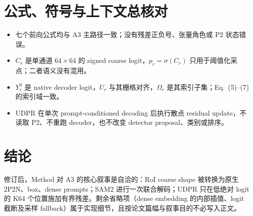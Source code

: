 \documentclass[UTF8,11pt]{ctexart}
\begin{document}
\section*{公式、符号与上下文总核对}
\begin{itemize}
  \item 七个前向公式均与 A3 主路径一致；没有残差正负号、张量角色或 P2 状态错误。
  \item \(C_r\) 是单通道 $64\times64$ 的 signed coarse logit，\(p_r=\sigma(C_r)\) 只用于阈值化采点；二者语义没有混用。
  \item \(Y_r^0\) 是 native decoder logit，\(U_r\) 与其栅格对齐，\(\Omega_r\) 是其索引子集；Eq.~(5)--(7) 的索引域一致。
  \item UDPR 在单次 prompt-conditioned decoding 后执行散点 residual update，不读取 P2、不重跑 decoder，也不改变 detector proposal、类别或排序。
\end{itemize}

\section*{结论}
修订后，Method 对 A3 的核心叙事是自洽的：RoI coarse shape 被转换为原生 2P2N、box、dense prompts；SAM2 进行一次联合解码；UDPR 只在低绝对 logit 的 K64 个位置施加有界残差。剩余省略项（dense embedding 的内部插值、logit 截断及采样 fallback）属于实现细节，且按论文篇幅与叙事目的不必写入正文。
\end{document}
